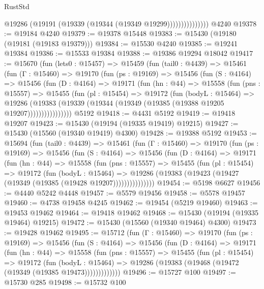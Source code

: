 \begin{lexlean}{RustStd}
\begin{coremodule}
{\begin{coremodule}
{{{{{{{{{{{{{{{{{{{{{{{{{{{{{{{{{{{{{{{{{{{{{{{{{{{{{{{{{{{{                        @19286 (@19191 (@19339 (@19344 (@19349 @19299)))))))))))))))
    @4240
@19378 := @19184 @4240
@19379 := @19378 @15448
@19383 := @15430 (@19180 (@19181 (@19183 @19379)))
@19384 := @15530 @4240
@19385 := @19241 @19384
@19386 := @15533 @19384
@19388 := @19386 @19294 @18042
@19417 := @15670
    (fun (lets0 : @15457) =>
    @15459
      (fun (tail0 : @4439) =>
      @15461
        (fun (Γ : @15460) =>
        @19170
          (fun (ps : @19169) =>
          @15456
            (fun (S : @4164) =>
            @15456
              (fun (D : @4164) =>
              @19171
                (fun (hn : @44) =>
                @15558
                  (fun (pns : @15557) =>
                  @15455
                    (fun (pl : @15454) =>
                    @19172
                      (fun (bodyL : @15464) =>
                      @19286
                        (@19383
                          (@19339 (@19344 (@19349 (@19385 (@19388 @19205 @19207))))))))))))))))
    @5192
@19418 := @4431 @5192
@19419 := @19418 @19207
@19423 := @15430 (@19194 (@19335 @19419) @19215)
@19427 := @15430 (@15560 (@19340 @19419) @4300)
@19428 := @19388 @5192
@19453 := @15694
    (fun (tail0 : @4439) =>
    @15461
      (fun (Γ : @15460) =>
      @19170
        (fun (ps : @19169) =>
        @15456
          (fun (S : @4164) =>
          @15456
            (fun (D : @4164) =>
            @19171
              (fun (hn : @44) =>
              @15558
                (fun (pns : @15557) =>
                @15455
                  (fun (pl : @15454) =>
                  @19172
                    (fun (bodyL : @15464) =>
                    @19286 (@19383 (@19423 (@19427 (@19349 (@19385 (@19428 @19207)))))))))))))))
@19454 := @5198 @6627
@19456 := @4440 @5242 @4448
@19457 := @5579 @19456
@19458 := @5578 @19457
@19460 := @4738 @19458 @4245
@19462 := @19454 (@5219 @19460)
@19463 := @19453 @19462
@19464 := @19418 @19462
@19468 := @15430 (@19194 (@19335 @19464) @19215)
@19472 := @15430 (@15560 (@19340 @19464) @4300)
@19473 := @19428 @19462
@19495 := @15712
    (fun (Γ : @15460) =>
    @19170
      (fun (ps : @19169) =>
      @15456
        (fun (S : @4164) =>
        @15456
          (fun (D : @4164) =>
          @19171
            (fun (hn : @44) =>
            @15558
              (fun (pns : @15557) =>
              @15455
                (fun (pl : @15454) =>
                @19172
                  (fun (bodyL : @15464) =>
                  @19286 (@19383 (@19468 (@19472 (@19349 (@19385 @19473)))))))))))))
@19496 := @15727 @100
@19497 := @15730 @285
@19498 := @15732 @100
}}}}}}}}}}}}}}}}}}}}}}}}}}}}}}}}}}}}}}}}}}}}}}}}}}}}}}}}}}}}
\end{coremodule}}
\end{coremodule}
\end{lexlean}

